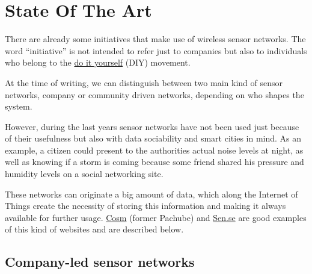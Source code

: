 
\chapter{State Of The Art} %

\label{Chapter2} %



There are already some initiatives that make use of wireless sensor networks. The word ``initiative'' is not intended to refer just to companies but also to individuals who belong to the \href{https://en.wikipedia.org/wiki/Do_it_yourself}{do it yourself} (DIY) movement.

At the time of writing, we can distinguish between two main kind of sensor networks, company or community driven networks, depending on who shapes the system.

However, during the last years sensor networks have not been used just because of their usefulness but also with data sociability and smart cities in mind. As an example, a citizen could present to the authorities actual noise levels at night, as well as knowing if a storm is coming because some friend shared his pressure and humidity levels on a social networking site.

These networks can originate a big amount of data, which along the Internet of Things create the necessity of storing this information and making it always available for further usage. \href{http://www.cosm.com/}{Cosm} (former Pachube) and \href{http://open.sen.se/}{Sen.se} are good examples of this kind of websites and are described below.


\section{Company-led sensor networks}

